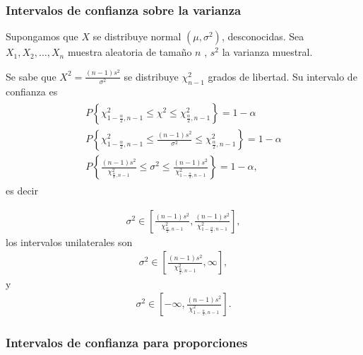 \documentclass[a4paper]{report} %
\begin{document}
\subsubsection{Intervalos de confianza sobre la varianza}

Supongamos que  $X$ se distribuye normal $\left(\mu,\sigma^{2}\right)$, desconocidas. Sea $X_{1},X_{2},\ldots,X_{n}$ muestra aleatoria de tama\~no $n$ , $s^{2}$ la varianza muestral.

Se sabe que $X^{2}=\frac{\left(n-1\right)s^{2}}{\sigma^{2}}$ se distribuye $\chi^{2}_{n-1}$ grados de libertad. Su intervalo de confianza es
\begin{eqnarray}
\begin{array}{l}
P\left\{\chi^{2}_{1-\frac{\alpha}{2},n-1}\leq\chi^{2}\leq\chi^{2}_{\frac{\alpha}{2},n-1}\right\}=1-\alpha\\
P\left\{\chi^{2}_{1-\frac{\alpha}{2},n-1}\leq\frac{\left(n-1\right)s^{2}}{\sigma^{2}}\leq\chi^{2}_{\frac{\alpha}{2},n-1}\right\}=1-\alpha\\
P\left\{\frac{\left(n-1\right)s^{2}}{\chi^{2}_{\frac{\alpha}{2},n-1}}\leq\sigma^{2}\leq\frac{\left(n-1\right)s^{2}}{\chi^{2}_{1-\frac{\alpha}{2},n-1}}\right\}=1-\alpha,
\end{array}
\end{eqnarray}
es decir

\begin{eqnarray}
\sigma^{2}\in\left[\frac{\left(n-1\right)s^{2}}{\chi^{2}_{\frac{\alpha}{2},n-1}},\frac{\left(n-1\right)s^{2}}{\chi^{2}_{1-\frac{\alpha}{2},n-1}}\right],
\end{eqnarray}
los intervalos unilaterales son
\begin{eqnarray}
\sigma^{2}\in\left[\frac{\left(n-1\right)s^{2}}{\chi^{2}_{\frac{\alpha}{2},n-1}},\infty\right],
\end{eqnarray}
y
\begin{eqnarray}
\sigma^{2}\in\left[-\infty,\frac{\left(n-1\right)s^{2}}{\chi^{2}_{1-\frac{\alpha}{2},n-1}}\right].
\end{eqnarray}

\subsubsection{Intervalos de confianza para proporciones}
\end{document}
